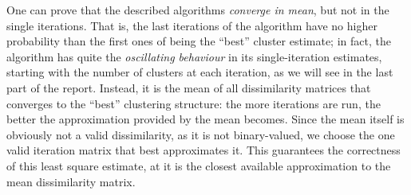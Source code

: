 One can prove that the described algorithms \emph{converge in mean}, but not in the single iterations.
That is, the last iterations of the algorithm have no higher probability than the first ones of being the ``best'' cluster estimate; in fact, the algorithm has quite the \emph{oscillating behaviour} in its single-iteration estimates, starting with the number of clusters at each iteration, as we will see in the last part of the report.
Instead, it is the mean of all dissimilarity matrices that converges to the ``best'' clustering structure: the more iterations are run, the better the approximation provided by the mean becomes.
Since the mean itself is obviously not a valid dissimilarity, as it is not binary-valued, we choose the one valid iteration matrix that best approximates it.
This guarantees the correctness of this least square estimate, at it is the closest available approximation to the mean dissimilarity matrix.



